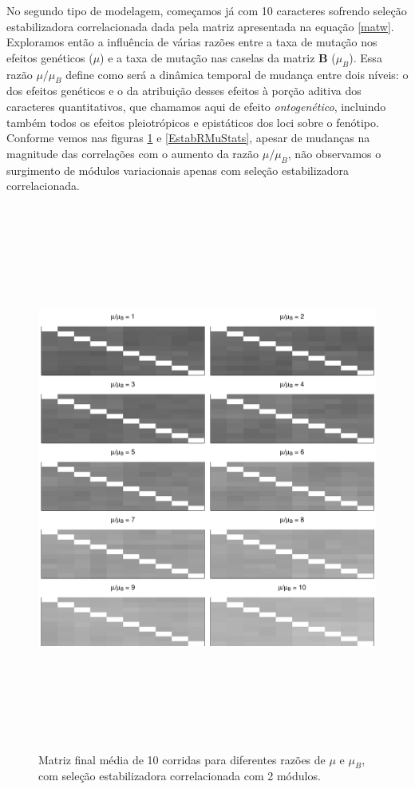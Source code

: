 No segundo tipo de modelagem, começamos já com 10 caracteres sofrendo
seleção estabilizadora correlacionada dada pela matriz apresentada na
equação \ref{matw}. 
Exploramos então a influência de várias razões entre a taxa de mutação
nos efeitos genéticos ($\mu$) e a taxa de mutação nas caselas da matriz
$\mathbf{B}$ ($\mu_B$). 
Essa razão $\mu/\mu_B$ define como será a dinâmica temporal de mudança
entre dois níveis: o dos efeitos genéticos e o da atribuição desses
efeitos à porção aditiva dos caracteres quantitativos, que chamamos aqui de efeito {\it
ontogenético}, incluindo também todos os efeitos pleiotrópicos e
epistáticos dos loci sobre o fenótipo. 
Conforme vemos nas figuras \ref{MatBEstab} e \ref{EstabRMuStats}, apesar de mudanças na
magnitude das correlações com o aumento da razão $\mu/\mu_B$, não
observamos o surgimento de módulos variacionais apenas com seleção
estabilizadora correlacionada. 


\begin{figure}[htbp]
    \centering
    \includegraphics[width=150mm, height=180mm]{figuras/MatBEstabRMu}
    \caption{Matriz final média de 10 corridas para diferentes razões de
        $\mu$ e $\mu_B$, com seleção estabilizadora correlacionada com 2
    módulos.}
    \label{MatBEstab}
\end{figure}




